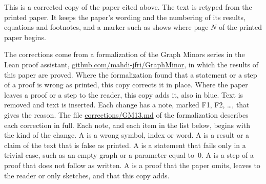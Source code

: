 
This is a corrected copy of the paper cited above. The text is retyped from the printed paper.
It keeps the paper's wording and the numbering of its results, equations and footnotes, and a
marker such as  shows where page $N$ of the printed paper begins.

The corrections come from a formalization of the Graph Minors series in the Lean proof
assistant, \href{https://github.com/mahdi-jfri/GraphMinor}{github.com/mahdi-jfri/GraphMinor},
in which the results of this paper are proved. Where the formalization found that a statement
or a step of a proof is wrong as printed, this copy corrects it in place. Where the paper leaves a proof or a step to the reader, this copy adds it, also in blue. Text  is removed and text  is inserted. Each change has a note, marked
\textcolor{fixcolor}{\sffamily F1}, \textcolor{fixcolor}{\sffamily F2}, \dots, that gives the
reason. The file
\href{https://github.com/mahdi-jfri/GraphMinor/blob/main/corrections/GM13.md}{corrections/GM13.md}
of the formalization describes each correction in full. Each note, and each item in the list below, begins with the kind of the change. A  is a wrong symbol, index or word. A  is a result or a claim of the text that is false as printed. A  is a statement that fails only in a trivial case, such as an empty graph or a parameter equal to~$0$. A  is a step of a proof that does not follow as written. A  is a proof that the paper omits, leaves to the reader or only sketches, and that this copy adds.

